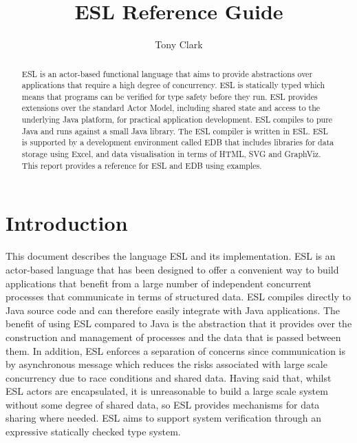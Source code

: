 \documentclass[5p,times]{elsarticle}
\begin{document}
\begin{frontmatter}


\title{ESL Reference Guide}

\author{Tony Clark}

\address{Aston University, Birmingham, UK}

\begin{abstract}
ESL is an actor-based functional language that aims to provide abstractions over applications that require a high degree of concurrency. ESL is statically typed which means that programs can be verified for type safety before they run. ESL provides extensions over the standard Actor Model, including shared state and access to the underlying Java platform, for practical application development. ESL compiles to pure Java and runs against a small Java library. The ESL compiler is written in ESL. ESL is supported by a development environment called EDB that includes libraries for data storage using Excel, and data visualisation in terms of HTML, SVG and GraphViz. This report provides a reference for ESL and EDB using examples.
\end{abstract}

\end{frontmatter}


\tableofcontents

\section{Introduction}

\label{sec:introduction}

This document describes the language ESL and its implementation. ESL is an actor-based language that has been designed to offer a convenient way to build applications that benefit from a large number of independent concurrent processes that communicate in terms of structured data. ESL compiles directly to Java source code and can therefore easily integrate with Java applications. The benefit of using ESL compared to Java is the abstraction that it provides over the construction and management of processes and the data that is passed between them. In addition, ESL enforces a separation of concerns since communication is by asynchronous message which reduces the risks associated with large scale concurrency due to race conditions and shared data. Having said that, whilst ESL actors are encapsulated, it is unreasonable to build a large scale system without some degree of shared data, so ESL provides mechanisms for data sharing where needed. ESL aims to support system verification through an expressive statically checked type system.
\end{document}
